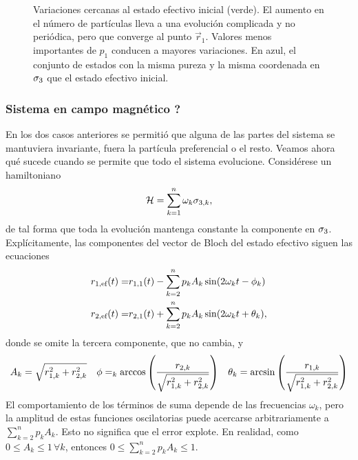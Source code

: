 \begin{figure}[ht!]
\begin{subfigure}{0.5\textwidth}
    \end{subfigure}
    \caption{Variaciones cercanas al estado efectivo inicial (verde). El aumento en el número de partículas lleva a una evolución complicada y no periódica, pero que converge al punto $\vec{r}_{1}$. Valores menos importantes de $p_{1}$ conducen a mayores variaciones. En azul, el conjunto de estados con la misma pureza y la misma coordenada en $\sigma_{3}$ que el estado efectivo inicial. }\label{fig:PrefInv2}
\end{figure}

\subsubsection{Sistema en campo magnético ? }

 

En los dos casos anteriores se permitió que alguna de las partes del sistema se mantuviera invariante, fuera la partícula preferencial o el resto. Veamos ahora qué sucede cuando se permite que todo el sistema evolucione. Considérese un hamiltoniano
\begin{equation}
    \mathcal{H}=\sum_{k=1}^{n}\omega_{k}\sigma_{3,k},\nonumber
\end{equation}
de tal forma que toda la evolución mantenga constante la componente en $\sigma_{3}$. Explícitamente, las componentes del vector de Bloch del estado efectivo siguen las ecuaciones
\begin{align}
    r_{1,\text{ef}}(t)=&r_{1,1}(t)-\sum_{k=2}^{n}p_{k}A_{k}\sin(2\omega_{k} t-\phi_{k})\nonumber\\
    r_{2,\text{ef}}(t)=&r_{2,1}(t)+\sum_{k=2}^{n}p_{k}A_{k}\sin(2\omega_{k} t+\theta_{k}),\nonumber
\end{align}
donde se omite la tercera componente, que no cambia, y
\begin{align}
    A_{k}=\sqrt{r_{1,k}^{2}+r_{2,k}^{2}} & & \phi=_{k}\arccos\qty(\frac{r_{2,k}}{\sqrt{r_{1,k}^{2}+r_{2,k}^{2}}}) & & \theta_{k}=\arcsin\qty(\frac{r_{1,k}}{\sqrt{r_{1,k}^{2}+r_{2,k}^{2}}})\nonumber
\end{align}
El comportamiento de los términos de suma depende de las frecuencias $\omega_{k}$, pero la amplitud de estas funciones oscilatorias puede acercarse arbitrariamente a $\sum_{k=2}^{n} p_{k} A_{k}$. Esto no significa que el error explote. En realidad, como $0\leq A_{k}\leq 1\,\forall k$, entonces $0\leq\sum_{k=2}^{n} p_{k} A_{k}\leq 1$. 


